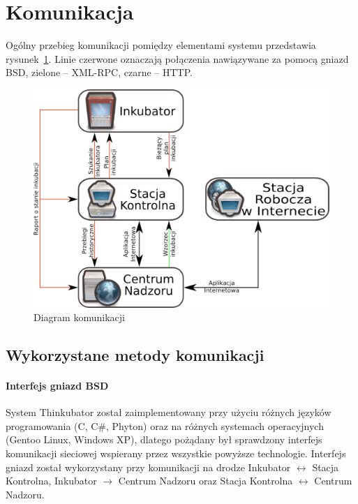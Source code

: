 \section{Komunikacja}
Ogólny przebieg komunikacji pomiędzy elementami systemu przedstawia
rysunek~\ref{rys:Komunikacja}. Linie czerwone oznaczają połączenia nawiązywane
za pomocą gniazd BSD, zielone -- XML-RPC, czarne -- HTTP.
\begin{figure}[b] 
\centering\includegraphics[width=.75\textwidth]{figures/Komunikacja}
\caption{Diagram komunikacji}\label{rys:Komunikacja}
\end{figure}

\subsection{Wykorzystane metody komunikacji}
\paragraph{Interfejs gniazd BSD}
System Thinkubator został zaimplementowany przy użyciu różnych języków
programowania (C, C\#, Phyton) oraz na różnych systemach operacyjnych (Gentoo
Linux, Windows XP), dlatego pożądany był sprawdzony interfejs komunikacji
sieciowej wspierany przez wszystkie powyższe technologie. Interfejs gniazd
został wykorzystany przy komunikacji na drodze Inkubator $\leftrightarrow$ Stacja Kontrolna,
Inkubator $\rightarrow$ Centrum Nadzoru oraz Stacja Kontrolna $\leftrightarrow$ Centrum Nadzoru.

